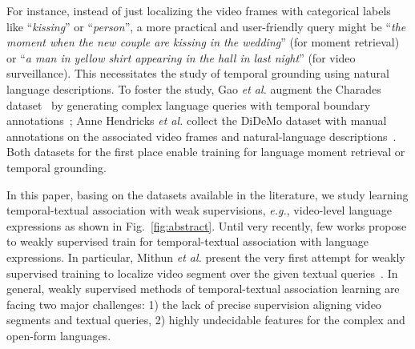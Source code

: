 For instance, 
instead of just localizing the video frames with categorical labels like  ``\textit{kissing}'' or ``\textit{person}'', 
a more practical and user-friendly query might be 
``\textit{the moment when the new couple are kissing in the wedding}'' (for moment retrieval) 
or ``\textit{a man in yellow shirt appearing in the hall in last night}'' (for video surveillance).
This necessitates the study of temporal grounding using natural language descriptions.
To foster the study, 
Gao \emph{et al.} augment the Charades 
dataset~\citep{sigurdsson2016hollywood} by generating complex language queries with temporal boundary annotations~\citep{gao2017tall};
Anne Hendricks \emph{et al.} collect the DiDeMo dataset with manual annotations 
on the associated video frames and natural-language descriptions~\citep{anne2017localizing}.
Both datasets for the first place enable training for language moment retrieval or temporal grounding. 

In this paper, basing on the datasets available in the literature,
we study learning temporal-textual association with 
weak supervisions, \emph{e.g.}, video-level language expressions
as shown in Fig.~\ref{fig:abstract}.
Until very recently, few works propose to weakly supervised train for temporal-textual association with language expressions.
In particular,
Mithun \emph{et al.} present the very first attempt for weakly supervised training
to localize video segment over the given textual queries~\citep{Mithun_2019_CVPR}. 
In general, weakly supervised methods of temporal-textual association learning
are facing two major challenges: 
1) the lack of precise supervision aligning video segments and textual queries,
2) highly undecidable features for the complex and open-form languages.




